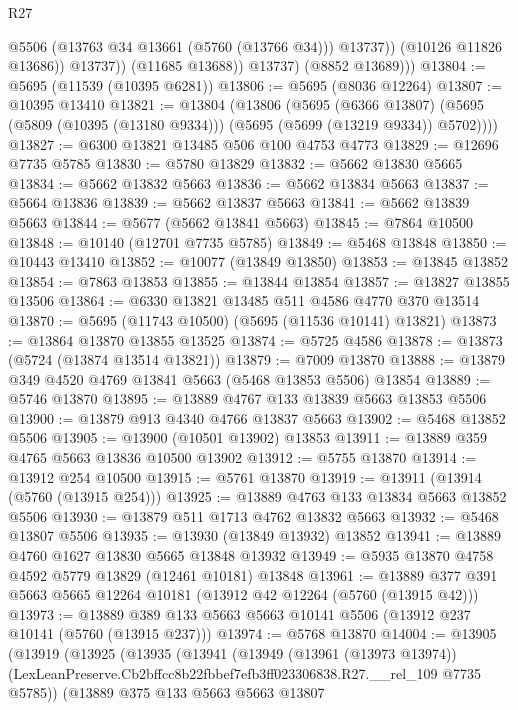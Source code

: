 \begin{lexlean}{R27}
\begin{coremodule}
                      @5506
                      (@13763 @34 @13661 (@5760 (@13766 @34)))
                      @13737))
                  (@10126 @11826 @13686))
                @13737))
            (@11685 @13688))
          @13737)
        (@8852 @13689)))
@13804 := @5695 (@11539 (@10395 @6281))
@13806 := @5695 (@8036 @12264)
@13807 := @10395 @13410
@13821 := @13804
    (@13806
      (@5695
        (@6366 @13807)
        (@5695 (@5809 (@10395 (@13180 @9334))) (@5695 (@5699 (@13219 @9334)) @5702))))
@13827 := @6300 @13821 @13485 @506 @100 @4753 @4773
@13829 := @12696 @7735 @5785
@13830 := @5780 @13829
@13832 := @5662 @13830 @5665
@13834 := @5662 @13832 @5663
@13836 := @5662 @13834 @5663
@13837 := @5664 @13836
@13839 := @5662 @13837 @5663
@13841 := @5662 @13839 @5663
@13844 := @5677 (@5662 @13841 @5663)
@13845 := @7864 @10500
@13848 := @10140 (@12701 @7735 @5785)
@13849 := @5468 @13848
@13850 := @10443 @13410
@13852 := @10077 (@13849 @13850)
@13853 := @13845 @13852
@13854 := @7863 @13853
@13855 := @13844 @13854
@13857 := @13827 @13855 @13506
@13864 := @6330 @13821 @13485 @511 @4586 @4770 @370 @13514
@13870 := @5695 (@11743 @10500) (@5695 (@11536 @10141) @13821)
@13873 := @13864 @13870 @13855 @13525
@13874 := @5725 @4586
@13878 := @13873 (@5724 (@13874 @13514 @13821))
@13879 := @7009 @13870
@13888 := @13879 @349 @4520 @4769 @13841 @5663 (@5468 @13853 @5506) @13854
@13889 := @5746 @13870
@13895 := @13889 @4767 @133 @13839 @5663 @13853 @5506
@13900 := @13879 @913 @4340 @4766 @13837 @5663
@13902 := @5468 @13852 @5506
@13905 := @13900 (@10501 @13902) @13853
@13911 := @13889 @359 @4765 @5663 @13836 @10500 @13902
@13912 := @5755 @13870
@13914 := @13912 @254 @10500
@13915 := @5761 @13870
@13919 := @13911 (@13914 (@5760 (@13915 @254)))
@13925 := @13889 @4763 @133 @13834 @5663 @13852 @5506
@13930 := @13879 @511 @1713 @4762 @13832 @5663
@13932 := @5468 @13807 @5506
@13935 := @13930 (@13849 @13932) @13852
@13941 := @13889 @4760 @1627 @13830 @5665 @13848 @13932
@13949 := @5935 @13870 @4758 @4592 @5779 @13829 (@12461 @10181) @13848
@13961 := @13889 @377 @391 @5663 @5665 @12264 @10181 (@13912 @42 @12264 (@5760 (@13915 @42)))
@13973 := @13889 @389 @133 @5663 @5663 @10141 @5506 (@13912 @237 @10141 (@5760 (@13915 @237)))
@13974 := @5768 @13870
@14004 := @13905
    (@13919
      (@13925
        (@13935
          (@13941
            (@13949
              (@13961 (@13973 @13974))
              (LexLeanPreserve.Cb2bffcc8b22fbbef7efb3ff023306838.R27.__rel_109 @7735 @5785))
            (@13889
              @375
              @133
              @5663
              @5663
              @13807

\end{coremodule}
\end{lexlean}
